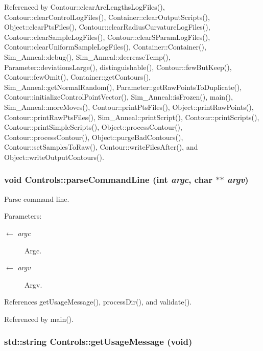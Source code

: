 Referenced by Contour::clearArcLengthsLogFiles(), Contour::clearControlLogFiles(), Container::clearOutputScripts(), Object::clearPtsFiles(), Contour::clearRadiusCurvatureLogFiles(), Contour::clearSampleLogFiles(), Contour::clearSParamLogFiles(), Contour::clearUniformSampleLogFiles(), Container::Container(), Sim\_\-Anneal::debug(), Sim\_\-Anneal::decreaseTemp(), Parameter::deviationsLarge(), distinguishable(), Contour::fewButKeep(), Contour::fewOmit(), Container::getContours(), Sim\_\-Anneal::getNormalRandom(), Parameter::getRawPointsToDuplicate(), Contour::initializeControlPointVector(), Sim\_\-Anneal::isFrozen(), main(), Sim\_\-Anneal::moreMoves(), Contour::printPtsFiles(), Object::printRawPoints(), Contour::printRawPtsFiles(), Sim\_\-Anneal::printScript(), Contour::printScripts(), Contour::printSimpleScripts(), Object::processContour(), Contour::processContour(), Object::purgeBadContours(), Contour::setSamplesToRaw(), Contour::writeFilesAfter(), and Object::writeOutputContours().\hypertarget{classControls_c155d57ffffad8062dca68e5dd8e45c1}{
\subsubsection[parseCommandLine]{\setlength{\rightskip}{0pt plus 5cm}void Controls::parseCommandLine (int {\em argc}, \/  char $\ast$$\ast$ {\em argv})}}
\label{classControls_c155d57ffffad8062dca68e5dd8e45c1}


Parse command line. \begin{Desc}
\item[Parameters:]
\begin{description}
\item[\mbox{$\leftarrow$} {\em argc}]Argc. \item[\mbox{$\leftarrow$} {\em argv}]Argv. \end{description}
\end{Desc}


References getUsageMessage(), processDir(), and validate().

Referenced by main().\hypertarget{classControls_cc10201b6a7efde6066fd29e797abaf4}{
\subsubsection[getUsageMessage]{\setlength{\rightskip}{0pt plus 5cm}std::string Controls::getUsageMessage (void)}}
\label{classControls_cc10201b6a7efde6066fd29e797abaf4}


